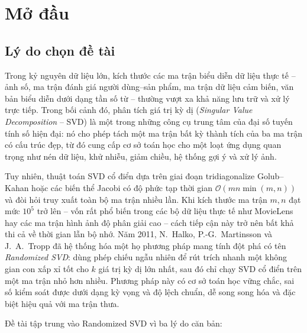 \section{Mở đầu}\label{sec:introduction}

\subsection{Lý do chọn đề tài}\label{subsec:rationale}

Trong kỷ nguyên dữ liệu lớn, kích thước các ma trận biểu diễn dữ liệu thực tế --
ảnh số, ma trận đánh giá người dùng--sản phẩm, ma trận dữ liệu cảm biến, văn bản
biểu diễn dưới dạng tần số từ -- thường vượt xa khả năng lưu trữ và xử lý trực
tiếp. Trong bối cảnh đó, phân tích giá trị kỳ dị (\emph{Singular Value
Decomposition} -- SVD) là một trong những công cụ trung tâm của đại số tuyến
tính số hiện đại: nó cho phép tách một ma trận bất kỳ thành tích của ba ma trận
có cấu trúc đẹp, từ đó cung cấp cơ sở toán học cho một loạt ứng dụng quan
trọng như nén dữ liệu, khử nhiễu, giảm chiều, hệ thống gợi ý và xử lý ảnh.

Tuy nhiên, thuật toán SVD cổ điển dựa trên giai đoạn tridiagonalize Golub--Kahan
hoặc các biến thể Jacobi có độ phức tạp thời gian
$\mathcal{O}(mn\min(m,n))$ và đòi hỏi truy xuất toàn bộ ma trận nhiều lần.
Khi kích thước ma trận $m, n$ đạt mức $10^5$ trở lên -- vốn rất phổ biến trong
các bộ dữ liệu thực tế như MovieLens hay các ma trận hình ảnh độ phân giải cao
-- cách tiếp cận này trở nên bất khả thi cả về thời gian lẫn bộ nhớ. Năm 2011,
N.~Halko, P.-G.~Martinsson và J.~A.~Tropp đã hệ thống hóa một họ phương pháp
mang tính đột phá có tên \emph{Randomized SVD}: dùng phép chiếu ngẫu nhiên để
rút trích nhanh một không gian con xấp xỉ tốt cho $k$ giá trị kỳ dị lớn nhất,
sau đó chỉ chạy SVD cổ điển trên một ma trận nhỏ hơn nhiều. Phương pháp này có
cơ sở toán học vững chắc, sai số kiểm soát được dưới dạng kỳ vọng và độ lệch
chuẩn, dễ song song hóa và đặc biệt hiệu quả với ma trận thưa.

Đề tài tập trung vào Randomized SVD vì ba lý do căn bản:

